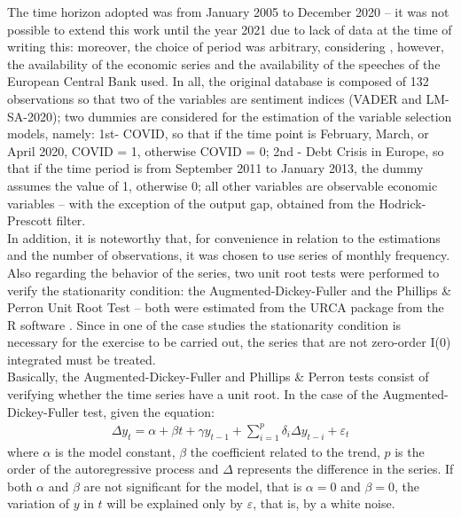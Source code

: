 The time horizon adopted was from January 2005 to December 2020 -- it was not possible to extend this work until the year 2021 due to lack of data at the time of writing this: moreover, the choice of period was arbitrary, considering , however, the availability of the economic series and the availability of the speeches of the European Central Bank used. In all, the original database is composed of 132 observations so that two of the variables are sentiment indices (VADER and LM-SA-2020); two dummies are considered for the estimation of the variable selection models, namely: 1st- COVID, so that if the time point is February, March, or April 2020, COVID = 1, otherwise COVID = 0; 2nd - Debt Crisis in Europe, so that if the time period is from September 2011 to January 2013, the dummy assumes the value of 1, otherwise 0; all other variables are observable economic variables -- with the exception of the output gap, obtained from the Hodrick-Prescott filter.\\

In addition, it is noteworthy that, for convenience in relation to the estimations and the number of observations, it was chosen to use series of monthly frequency.\\

Also regarding the behavior of the series, two unit root tests were performed to verify the stationarity condition: the Augmented-Dickey-Fuller \cite[]{cheung1995lag} and the Phillips \& Perron Unit Root Test \cite[]{phillips1988testing} -- both were estimated from the URCA package \cite[]{urcacran} from the R software \cite[]{rcran}. Since in one of the case studies the stationarity condition is necessary for the exercise to be carried out, the series that are not zero-order I(0) integrated must be treated.\\

Basically, the Augmented-Dickey-Fuller and Phillips \& Perron tests consist of verifying whether the time series have a unit root. In the case of the Augmented-Dickey-Fuller test, given the equation:
\begin{align}
    \Delta y_t = \alpha + \beta t + \gamma y_{t-1} + \sum_{i=1}^{p} \delta_i \Delta y_{t-i} + \varepsilon_t
\end{align}
where $\alpha$ is the model constant, $\beta$ the coefficient related to the trend, $p$ is the order of the autoregressive process and $\Delta$ represents the difference in the series. If both $\alpha$ and $\beta$ are not significant for the model, that is $\alpha = 0$ and $\beta = 0$, the variation of $y$ in $t$ will be explained only by $\varepsilon$, that is, by a white noise.\\

